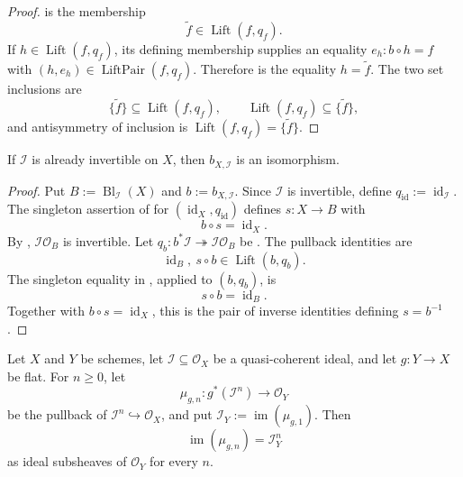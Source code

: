 \begin{proof}
   is the membership
  \[
    \widetilde f\in\operatorname{Lift}(f,q_f).
  \]
  If $h\in\operatorname{Lift}(f,q_f)$, its defining membership supplies an
  equality $e_h\colon b\circ h=f$ with
  $(h,e_h)\in\operatorname{LiftPair}(f,q_f)$.  Therefore
   is the equality
  $h=\widetilde f$.  The two set inclusions are
  \[
    \{\widetilde f\}\subseteq\operatorname{Lift}(f,q_f),
    \qquad
    \operatorname{Lift}(f,q_f)\subseteq\{\widetilde f\},
  \]
  and antisymmetry of inclusion is
  $\operatorname{Lift}(f,q_f)=\{\widetilde f\}$.
\end{proof}

\begin{corollary}
  \label{cor:nagata-blowup-cartier-iso}

  If $\mathcal I$ is already invertible on $X$, then
  $b_{X,\mathcal I}$ is an isomorphism.
\end{corollary}

\begin{proof}
  Put $B:=\operatorname{Bl}_{\mathcal I}(X)$ and $b:=b_{X,\mathcal I}$.
  Since $\mathcal I$ is invertible, define
  $q_{\operatorname{id}}:=\operatorname{id}_{\mathcal I}$.  The singleton
  assertion of  for
  $(\operatorname{id}_X,q_{\operatorname{id}})$ defines
  $s\colon X\to B$ with
  \[
    b\circ s=\operatorname{id}_X.
  \]
  By ,
  $\mathcal I\mathcal O_B$ is invertible.  Let
  $q_b\colon b^*\mathcal I\twoheadrightarrow\mathcal I\mathcal O_B$ be
  .  The pullback identities are
  \[
    \operatorname{id}_B,\ s\circ b\in\operatorname{Lift}(b,q_b).
  \]
  The singleton equality in
  , applied to $(b,q_b)$, is
  \[
    s\circ b=\operatorname{id}_B.
  \]
  Together with $b\circ s=\operatorname{id}_X$, this is the pair of inverse
  identities defining $s=b^{-1}$.
\end{proof}

\begin{lemma}
  \label{lemma:nagata-flat-pullback-ideal-pow}

  Let $X$ and $Y$ be schemes, let
  $\mathcal I\subseteq\mathcal O_X$ be a quasi-coherent ideal, and let
  $g\colon Y\to X$ be flat.  For $n\ge0$, let
  \[
    \mu_{g,n}\colon g^*(\mathcal I^n)\longrightarrow\mathcal O_Y
  \]
  be the pullback of $\mathcal I^n\hookrightarrow\mathcal O_X$, and put
  $\mathcal I_Y:=\operatorname{im}(\mu_{g,1})$.  Then
  \[
    \operatorname{im}(\mu_{g,n})=\mathcal I_Y^n
  \]
  as ideal subsheaves of $\mathcal O_Y$ for every $n$.
\end{lemma}

